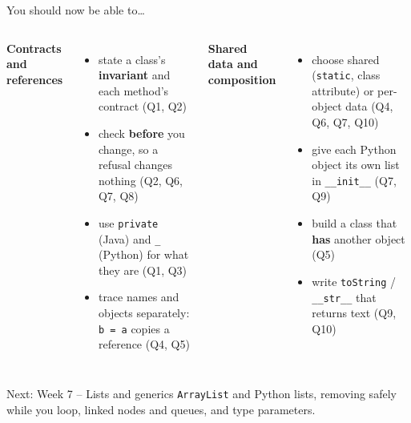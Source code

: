 \documentclass[aspectratio=169]{beamer}
\newcommand{\code}[1]{\texttt{#1}}
\newcommand{\neutrallabel}[1]{\textcolor{bkblue}{\textbf{#1}}}
\newcommand{\yes}{\textcolor{goodgreen}{\ding{51}}}
\begin{document}
\begin{frame}{You should now be able to\ldots}
  \begin{columns}[T,onlytextwidth]
    \neutrallabel{Contracts and references}
    \begin{itemize}[itemsep=0.12em]
      \small
      \item[\yes] state a class's \textbf{invariant} and each method's contract (Q1, Q2)
      \item[\yes] check \textbf{before} you change, so a refusal changes nothing
            (Q2, Q6, Q7, Q8)
      \item[\yes] use \code{private} (Java) and \code{\_} (Python) for what they are
            (Q1, Q3)
      \item[\yes] trace names and objects separately: \code{b = a} copies a reference
            (Q4, Q5)
    \end{itemize}
    \neutrallabel{Shared data and composition}
    \begin{itemize}[itemsep=0.12em]
      \small
      \item[\yes] choose shared (\code{static}, class attribute) or per-object data
            (Q4, Q6, Q7, Q10)
      \item[\yes] give each Python object its own list in \code{\_\_init\_\_}
            (Q7, Q9)
      \item[\yes] build a class that \textbf{has} another object (Q5)
      \item[\yes] write \code{toString} / \code{\_\_str\_\_} that returns text (Q9, Q10)
    \end{itemize}
  \end{columns}
  \vspace{0.3em}
  \begin{contextbox}{Next: Week 7 -- Lists and generics}
    \footnotesize \code{ArrayList} and Python lists, removing safely while you loop,
    linked nodes and queues, and type parameters.
  \end{contextbox}
\end{frame}
\end{document}
